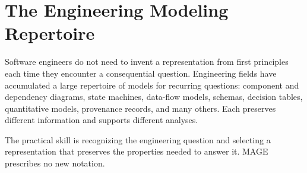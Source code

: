 \section{The Engineering Modeling Repertoire}\label{heading:the-engineering-modeling-repertoire}




Software engineers do not need to invent a representation from first principles each time they encounter a consequential question. Engineering fields have accumulated a large repertoire of models for recurring questions: component and dependency diagrams, state machines, data-flow models, schemas, decision tables, quantitative models, provenance records, and many others. Each preserves different information and supports different analyses.


The practical skill is recognizing the engineering question and selecting a representation that preserves the properties needed to answer it. MAGE prescribes no new notation.





